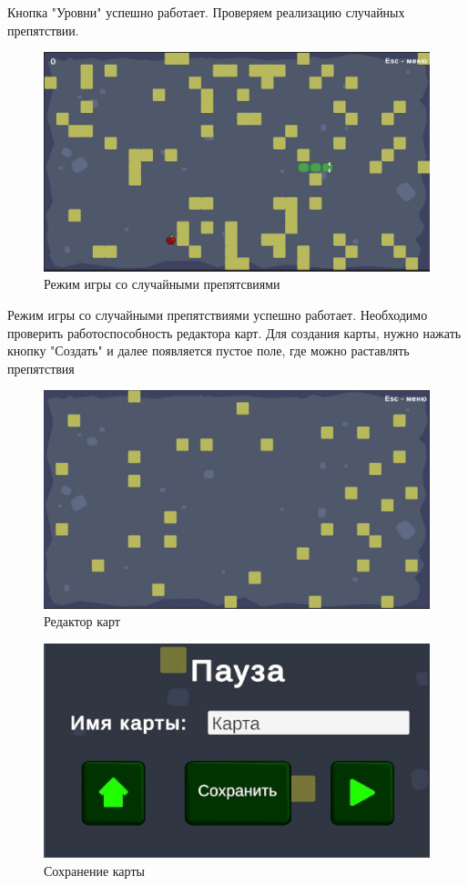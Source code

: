 Кнопка "Уровни" успешно работает. Проверяем реализацию случайных препятствии.

\begin{figure}[h]
\centering
\includegraphics[width=0.8\linewidth]{images/random.jpg}
\caption{Режим игры со случайными препятсвиями}
\label{fig:mpr}
\end{figure}

Режим игры со случайными препятствиями успешно работает.
Необходимо проверить работоспособность редактора карт. Для создания карты, нужно нажать кнопку "Создать" и далее появляется пустое поле, где можно раставлять препятствия

\begin{figure}[h]
\centering
\includegraphics[width=0.8\linewidth]{images/editor.jpg}
\caption{Редактор карт}
\label{fig:mpr}
\end{figure}

\begin{figure}[h]
\centering
\includegraphics[width=0.8\linewidth]{images/UChfYsjxFxY.jpg}
\caption{Сохранение карты}
\label{fig:mpr}
\end{figure}

